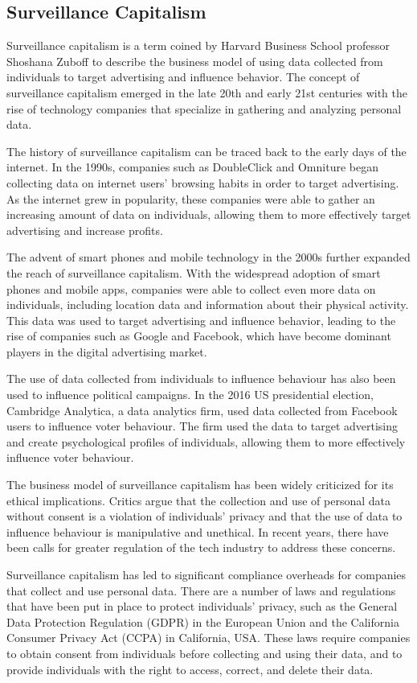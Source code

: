 \subsection{Surveillance Capitalism}
Surveillance capitalism is a term coined by Harvard Business School professor Shoshana Zuboff to describe the business model of using data collected from individuals to target advertising and influence behavior. The concept of surveillance capitalism emerged in the late 20th and early 21st centuries with the rise of technology companies that specialize in gathering and analyzing personal data.\par
The history of surveillance capitalism can be traced back to the early days of the internet. In the 1990s, companies such as DoubleClick and Omniture began collecting data on internet users' browsing habits in order to target advertising. As the internet grew in popularity, these companies were able to gather an increasing amount of data on individuals, allowing them to more effectively target advertising and increase profits.\par
The advent of smart phones and mobile technology in the 2000s further expanded the reach of surveillance capitalism. With the widespread adoption of smart phones and mobile apps, companies were able to collect even more data on individuals, including location data and information about their physical activity. This data was used to target advertising and influence behavior, leading to the rise of companies such as Google and Facebook, which have become dominant players in the digital advertising market.\par
The use of data collected from individuals to influence behaviour has also been used to influence political campaigns. In the 2016 US presidential election, Cambridge Analytica, a data analytics firm, used data collected from Facebook users to influence voter behaviour. The firm used the data to target advertising and create psychological profiles of individuals, allowing them to more effectively influence voter behaviour.\par
The business model of surveillance capitalism has been widely criticized for its ethical implications. Critics argue that the collection and use of personal data without consent is a violation of individuals' privacy and that the use of data to influence behaviour is manipulative and unethical. In recent years, there have been calls for greater regulation of the tech industry to address these concerns.\par 
Surveillance capitalism has led to significant compliance overheads for companies that collect and use personal data. There are a number of laws and regulations that have been put in place to protect individuals' privacy, such as the General Data Protection Regulation (GDPR) in the European Union and the California Consumer Privacy Act (CCPA) in California, USA. These laws require companies to obtain consent from individuals before collecting and using their data, and to provide individuals with the right to access, correct, and delete their data.\par 
